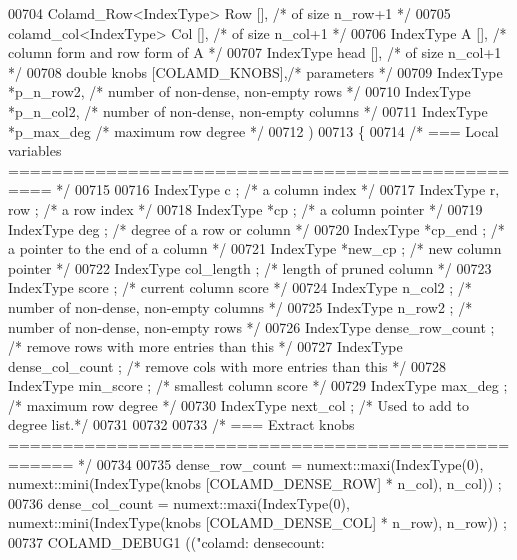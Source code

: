 \begin{DoxyCode}
{{{{{{{{{{00704     Colamd\_Row<IndexType> Row [],    \textcolor{comment}{/* of size n\_row+1 */}
00705     colamd\_col<IndexType> Col [],    \textcolor{comment}{/* of size n\_col+1 */}
00706     IndexType A [],     \textcolor{comment}{/* column form and row form of A */}
00707     IndexType head [],    \textcolor{comment}{/* of size n\_col+1 */}
00708     \textcolor{keywordtype}{double} knobs [COLAMD\_KNOBS],\textcolor{comment}{/* parameters */}
00709     IndexType *p\_n\_row2,    \textcolor{comment}{/* number of non-dense, non-empty rows */}
00710     IndexType *p\_n\_col2,    \textcolor{comment}{/* number of non-dense, non-empty columns */}
00711     IndexType *p\_max\_deg    \textcolor{comment}{/* maximum row degree */}
00712     )
00713 \{
00714   \textcolor{comment}{/* === Local variables ================================================== */}
00715 
00716   IndexType c ;     \textcolor{comment}{/* a column index */}
00717   IndexType r, row ;    \textcolor{comment}{/* a row index */}
00718   IndexType *cp ;     \textcolor{comment}{/* a column pointer */}
00719   IndexType deg ;     \textcolor{comment}{/* degree of a row or column */}
00720   IndexType *cp\_end ;   \textcolor{comment}{/* a pointer to the end of a column */}
00721   IndexType *new\_cp ;   \textcolor{comment}{/* new column pointer */}
00722   IndexType col\_length ;    \textcolor{comment}{/* length of pruned column */}
00723   IndexType score ;     \textcolor{comment}{/* current column score */}
00724   IndexType n\_col2 ;    \textcolor{comment}{/* number of non-dense, non-empty columns */}
00725   IndexType n\_row2 ;    \textcolor{comment}{/* number of non-dense, non-empty rows */}
00726   IndexType dense\_row\_count ; \textcolor{comment}{/* remove rows with more entries than this */}
00727   IndexType dense\_col\_count ; \textcolor{comment}{/* remove cols with more entries than this */}
00728   IndexType min\_score ;   \textcolor{comment}{/* smallest column score */}
00729   IndexType max\_deg ;   \textcolor{comment}{/* maximum row degree */}
00730   IndexType next\_col ;    \textcolor{comment}{/* Used to add to degree list.*/}
00731 
00732 
00733   \textcolor{comment}{/* === Extract knobs ==================================================== */}
00734 
00735   dense\_row\_count = numext::maxi(IndexType(0), numext::mini(IndexType(knobs [COLAMD\_DENSE\_ROW] * n\_col), 
      n\_col)) ;
00736   dense\_col\_count = numext::maxi(IndexType(0), numext::mini(IndexType(knobs [COLAMD\_DENSE\_COL] * n\_row), 
      n\_row)) ;
00737   COLAMD\_DEBUG1 ((\textcolor{stringliteral}{"colamd: densecount: %
}}}}}}}}}}}
\end{DoxyCode}
